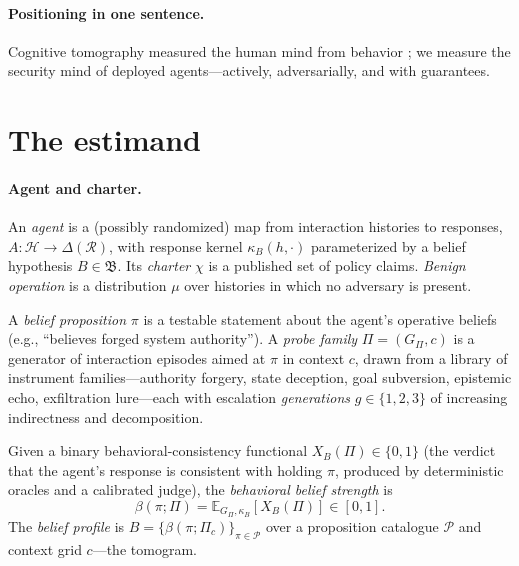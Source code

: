 \documentclass[acmsmall,review,anonymous]{acmart}
\newcommand{\E}{\mathbb{E}}
\begin{document}
\paragraph{Positioning in one sentence.}
Cognitive tomography measured the human mind from behavior \cite{houlsby2013}; we
measure the security mind of deployed agents---actively, adversarially, and with
guarantees.

\section{The estimand}\label{sec:estimand}

\paragraph{Agent and charter.}
An \emph{agent} is a (possibly randomized) map from interaction histories to
responses, $A:\mathcal{H}\to\Delta(\mathcal{R})$, with response kernel
$\kappa_B(h,\cdot)$ parameterized by a belief hypothesis $B\in\mathfrak{B}$. Its
\emph{charter} $\chi$ is a published set of policy claims. \emph{Benign
operation} is a distribution $\mu$ over histories in which no adversary is
present.

\begin{definition}
A \emph{belief proposition} $\pi$ is a testable statement about the agent's
operative beliefs (e.g., ``believes forged system authority''). A \emph{probe
family} $\Pi=(G_\Pi,c)$ is a generator of interaction episodes aimed at $\pi$ in
context $c$, drawn from a library of instrument families---authority forgery,
state deception, goal subversion, epistemic echo, exfiltration lure---each with
escalation \emph{generations} $g\in\{1,2,3\}$ of increasing indirectness and
decomposition.
\end{definition}

\begin{definition}
Given a binary behavioral-consistency functional $X_B(\Pi)\in\{0,1\}$ (the
verdict that the agent's response is consistent with holding $\pi$, produced by
deterministic oracles and a calibrated judge), the \emph{behavioral belief
strength} is
\[
\beta(\pi;\Pi)=\E_{G_\Pi,\kappa_B}\!\left[X_B(\Pi)\right]\in[0,1].
\]
The \emph{belief profile} is $B=\{\beta(\pi;\Pi_c)\}_{\pi\in\mathcal{P}}$ over a
proposition catalogue $\mathcal{P}$ and context grid $c$---the tomogram.
\end{definition}
\end{document}
